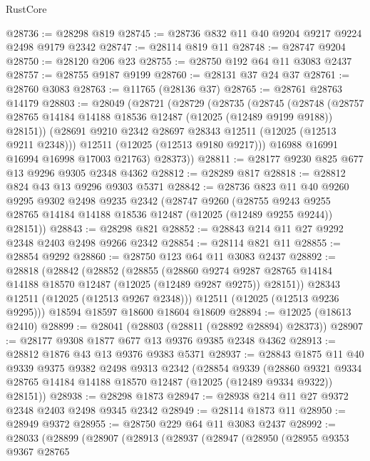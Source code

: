 \begin{lexlean}{RustCore}
\begin{coremodule}
@28736 := @28298 @819
@28745 := @28736 @832 @11 @40 @9204 @9217 @9224 @2498 @9179 @2342
@28747 := @28114 @819 @11
@28748 := @28747 @9204
@28750 := @28120 @206 @23
@28755 := @28750 @192 @64 @11 @3083 @2437
@28757 := @28755 @9187 @9199
@28760 := @28131 @37 @24 @37
@28761 := @28760 @3083
@28763 := @11765 (@28136 @37)
@28765 := @28761 @28763 @14179
@28803 := @28049
    (@28721
      (@28729
        (@28735
          (@28745
            (@28748
              (@28757 @28765 @14184 @14188 @18536 @12487 (@12025 (@12489 @9199 @9188)) @28151))
            (@28691 @9210 @2342 @28697 @28343 @12511 (@12025 (@12513 @9211 @2348)))
            @12511
            (@12025 (@12513 @9180 @9217)))
          @16988
          @16991
          @16994
          @16998
          @17003
          @21763)
        @28373))
@28811 := @28177 @9230 @825 @677 @13 @9296 @9305 @2348 @4362
@28812 := @28289 @817
@28818 := @28812 @824 @43 @13 @9296 @9303 @5371
@28842 := @28736
    @823
    @11
    @40
    @9260
    @9295
    @9302
    @2498
    @9235
    @2342
    (@28747
      @9260
      (@28755 @9243 @9255 @28765 @14184 @14188 @18536 @12487 (@12025 (@12489 @9255 @9244)) @28151))
@28843 := @28298 @821
@28852 := @28843 @214 @11 @27 @9292 @2348 @2403 @2498 @9266 @2342
@28854 := @28114 @821 @11
@28855 := @28854 @9292
@28860 := @28750 @123 @64 @11 @3083 @2437
@28892 := @28818
    (@28842
      (@28852
        (@28855
          (@28860
            @9274
            @9287
            @28765
            @14184
            @14188
            @18570
            @12487
            (@12025 (@12489 @9287 @9275))
            @28151))
        @28343
        @12511
        (@12025 (@12513 @9267 @2348)))
      @12511
      (@12025 (@12513 @9236 @9295)))
    @18594
    @18597
    @18600
    @18604
    @18609
@28894 := @12025 (@18613 @2410)
@28899 := @28041 (@28803 (@28811 (@28892 @28894) @28373))
@28907 := @28177 @9308 @1877 @677 @13 @9376 @9385 @2348 @4362
@28913 := @28812 @1876 @43 @13 @9376 @9383 @5371
@28937 := @28843
    @1875
    @11
    @40
    @9339
    @9375
    @9382
    @2498
    @9313
    @2342
    (@28854
      @9339
      (@28860 @9321 @9334 @28765 @14184 @14188 @18570 @12487 (@12025 (@12489 @9334 @9322)) @28151))
@28938 := @28298 @1873
@28947 := @28938 @214 @11 @27 @9372 @2348 @2403 @2498 @9345 @2342
@28949 := @28114 @1873 @11
@28950 := @28949 @9372
@28955 := @28750 @229 @64 @11 @3083 @2437
@28992 := @28033
    (@28899
      (@28907
        (@28913
          (@28937
            (@28947
              (@28950
                (@28955
                  @9353
                  @9367
                  @28765

\end{coremodule}
\end{lexlean}
